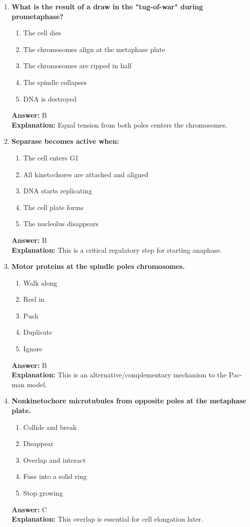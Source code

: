 \documentclass[11pt, a4paper]{article}
\begin{document}
\begin{enumerate}[leftmargin=*, label=\arabic*.]
\item \textbf{What is the result of a draw in the "tug-of-war" during prometaphase?}
\begin{enumerate}[label=\Alph*.]
\item The cell dies
\item The chromosomes align at the metaphase plate
\item The chromosomes are ripped in half
\item The spindle collapses
\item DNA is destroyed
\end{enumerate}
\textbf{Answer:} B \\
\textbf{Explanation:} Equal tension from both poles centers the chromosomes.

\item \textbf{Separase becomes active when:}
\begin{enumerate}[label=\Alph*.]
\item The cell enters G1
\item All kinetochores are attached and aligned
\item DNA starts replicating
\item The cell plate forms
\item The nucleolus disappears
\end{enumerate}
\textbf{Answer:} B \\
\textbf{Explanation:} This is a critical regulatory step for starting anaphase.

\item \textbf{Motor proteins at the spindle poles \underline{\hspace{1cm}} chromosomes.}
\begin{enumerate}[label=\Alph*.]
\item Walk along
\item Reel in
\item Push
\item Duplicate
\item Ignore
\end{enumerate}
\textbf{Answer:} B \\
\textbf{Explanation:} This is an alternative/complementary mechanism to the Pac-man model.

\item \textbf{Nonkinetochore microtubules from opposite poles \underline{\hspace{1cm}} at the metaphase plate.}
\begin{enumerate}[label=\Alph*.]
\item Collide and break
\item Disappear
\item Overlap and interact
\item Fuse into a solid ring
\item Stop growing
\end{enumerate}
\textbf{Answer:} C \\
\textbf{Explanation:} This overlap is essential for cell elongation later.


\end{enumerate}
\end{document}
